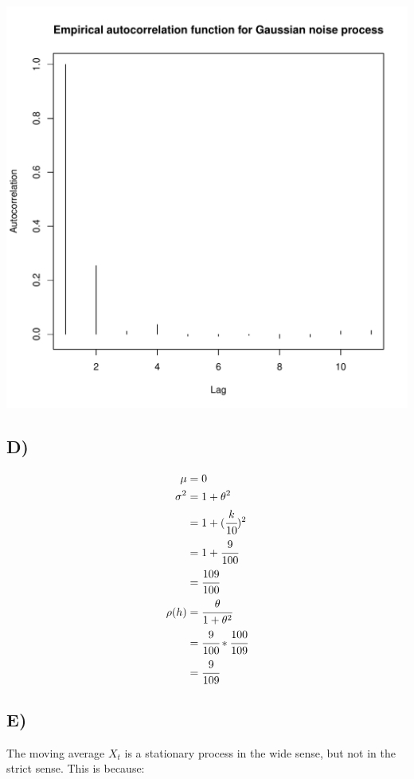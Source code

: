 \documentclass[11pt, letterpaper]{article}
\begin{document}
\begin{center}
	\includegraphics[scale=0.4]{code/q4c}
\end{center}

\subsection*{D)}

\begin{equation*}
	\begin{split}
		\mu &= 0\\
		\sigma^2 &= 1 + \theta^2\\
		&= 1 + (\cfrac{k}{10})^2\\
		&= 1 + \cfrac{9}{100} \\
		&= \cfrac{109}{100} \\
		\rho(h) &= \cfrac{\theta}{1 + \theta^2}\\
		&= \cfrac{9}{100} * \cfrac{100}{109}\\
		&= \cfrac{9}{109}
	\end{split}
\end{equation*}

\subsection*{E)}
The moving average $X_t$ is a stationary process in the wide sense, but not in
the strict sense.
This is because:
\end{document}
